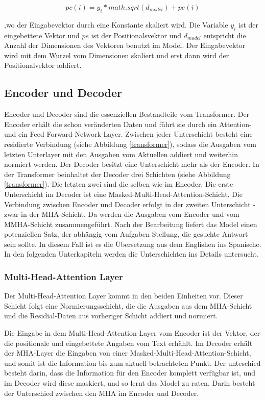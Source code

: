\begin{equation}
	pc(i) = y_i*math.sqrt(d_{model}) + pe(i)
\end{equation}

,wo der Eingabevektor durch eine Konstante skaliert wird. Die Variable $y_i$ ist der eingebettete Vektor und $pe$ ist der Positionalsvektor und $d_{model}$ entspricht die Anzahl der Dimensionen des Vektoren benutzt im Model. Der Eingabevektor wird mit dem Wurzel vom Dimensionen skaliert und erst dann wird der Positionalvektor addiert.

\subsection{Encoder und Decoder}

Encoder und Decoder sind die essenziellen Bestandteile vom Transformer. Der Encoder erhält die schon veränderten Daten und führt sie durch ein Attention- und ein Feed Forward Network-Layer. Zwischen jeder Unterschicht besteht eine residierte Verbindung (siehe Abbildung \ref{transformer}), sodass die Ausgaben vom letzten Unterlayer mit den Ausgaben vom Aktuellen addiert und weiterhin normiert werden. Der Decoder besitzt eine Unterschicht mehr als der Encoder. In der Transformer beinhaltet der Decoder drei Schichten (siehe Abbildung \ref{transformer}). Die letzten zwei sind die selben wie im Encoder. Die erste Unterschicht im Decoder ist eine Masked-Multi-Head-Attention-Schicht. Die Verbindung zwischen Encoder und Decoder erfolgt in der zweiten Unterschicht - zwar in der MHA-Schicht. Da werden die Ausgaben vom Encoder und vom MMHA-Schicht zusammengeführt. Nach der Bearbeitung liefert das Model einen potenziellen Satz, der abhängig vom Aufgaben Stellung, die gesuchte Antwort sein sollte. In diesem Fall ist es die Übersetzung aus dem Englishen ins Spanische. In den folgenden Unterkapiteln werden die Unterschichten ins Details untersucht.

\subsubsection{Multi-Head-Attention Layer} \label{MHA_Layer}
Der Multi-Head-Attention Layer kommt in den beiden Einheiten vor. Dieser Schicht folgt eine Normierungsschicht, die die Ausgaben aus dem MHA-Schicht und die Residial-Daten aus vorheriger Schicht addiert und normiert.

Die Eingabe in dem Multi-Head-Attention-Layer vom Encoder ist der Vektor, der die positionale und eingebettete Angaben vom Text erhählt. Im Decoder erhält der MHA-Layer die Eingaben von einer Masked-Multi-Head-Attention-Schicht, und somit ist die Information bis zum aktuell betrachteten Punkt. Der unteschied besteht darin, dass die Information für den Encoder komplett verfügbar ist, und im Decoder wird diese maskiert, und so lernt das Model zu raten. Darin besteht der Unterschied zwischen den MHA im Encoder und Decoder. 

